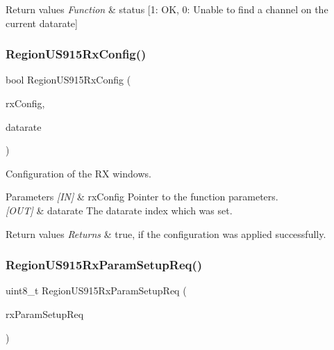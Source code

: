 \begin{DoxyRetVals}{Return values}
{\em Function} & status \mbox{[}1\+: OK, 0\+: Unable to find a channel on the current datarate\mbox{]} \\
\hline
\end{DoxyRetVals}
\mbox{\label{group__REGIONUS915_ga714ceef0507bb8bd0a65c5b2de8eff2c}} 
\subsubsection{\texorpdfstring{Region\+U\+S915\+Rx\+Config()}{RegionUS915RxConfig()}}
{\footnotesize\ttfamily bool Region\+U\+S915\+Rx\+Config (\begin{DoxyParamCaption}\item[{\hyperlink{group__REGION_ga375c038078dfcfc7ef14280021db719e}{Rx\+Config\+Params\+\_\+t} $\ast$}]{rx\+Config,  }\item[{int8\+\_\+t $\ast$}]{datarate }\end{DoxyParamCaption})}



Configuration of the RX windows. 


\begin{DoxyParams}{Parameters}
{\em \mbox{[}\+I\+N\mbox{]}} & rx\+Config Pointer to the function parameters.\\
\hline
{\em \mbox{[}\+O\+U\+T\mbox{]}} & datarate The datarate index which was set.\\
\hline
\end{DoxyParams}

\begin{DoxyRetVals}{Return values}
{\em Returns} & true, if the configuration was applied successfully. \\
\hline
\end{DoxyRetVals}
\mbox{\label{group__REGIONUS915_ga026be3770dc9e5787af7e181a142d47f}} 
\subsubsection{\texorpdfstring{Region\+U\+S915\+Rx\+Param\+Setup\+Req()}{RegionUS915RxParamSetupReq()}}
{\footnotesize\ttfamily uint8\+\_\+t Region\+U\+S915\+Rx\+Param\+Setup\+Req (\begin{DoxyParamCaption}\item[{\hyperlink{group__REGION_ga7165f282c670c728c36d534df2285157}{Rx\+Param\+Setup\+Req\+Params\+\_\+t} $\ast$}]{rx\+Param\+Setup\+Req }\end{DoxyParamCaption})}




